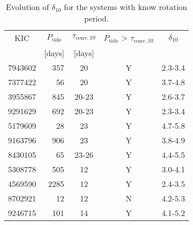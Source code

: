 \begin{table}[h!]
\caption{Evolution of $\delta_{\mathrm{10}}$ for the systems with know rotation period.}
\label{tab:10th}
\tabcolsep=10pt

\hfill\begin{tabular}{rrccc}
\hline\hline
\multicolumn{1}{c}{KIC} & 
\multicolumn{1}{c}{$P_{\mathrm{tide}}$} & $\tau_{\mathrm{conv,10}}$ & $P_{\mathrm{tide}}$ > $\tau_{\mathrm{conv,10}}$ & $\delta_{\mathrm{10}}$\\
 & \multicolumn{1}{c}{[days]} & [days] & & \\
\hline
7943602 & 357 & 20 & Y & 2.3-3.4  \\
7377422 & 56 & 20 & Y & 3.7-4.8\\
3955867 & 845 & 20-23 & Y & 2.6-3.7\\
9291629 & 692 & 20-23 & Y & 2.3-3.4 \\
5179609 & 28 & 23 & Y & 4.7-5.8 \\
9163796 & 906 & 23 & Y & 3.8-4.9 \\
8430105 & 65 & 23-26 & Y & 4.4-5.5 \\
5308778 & 505 & 12 & Y & 3.0-4.1\\
4569590 & 2285 & 12 & Y & 2.4-3.5\\
8702921 & 12 & 12 & N & 4.2-5.3\\
9246715 & 101 & 14 & Y & 4.1-5.2 \\
\hline
\end{tabular}\hfill~
\end{table}



